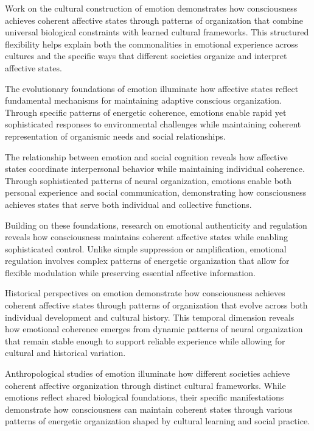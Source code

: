 Work on the cultural construction of emotion \cite{Lutz1988} demonstrates how consciousness achieves coherent affective states through patterns of organization that combine universal biological constraints with learned cultural frameworks. This structured flexibility helps explain both the commonalities in emotional experience across cultures and the specific ways that different societies organize and interpret affective states.

The evolutionary foundations of emotion \cite{Panksepp1998} illuminate how affective states reflect fundamental mechanisms for maintaining adaptive conscious organization. Through specific patterns of energetic coherence, emotions enable rapid yet sophisticated responses to environmental challenges while maintaining coherent representation of organismic needs and social relationships.

The relationship between emotion and social cognition \cite{Scherer2014} reveals how affective states coordinate interpersonal behavior while maintaining individual coherence. Through sophisticated patterns of neural organization, emotions enable both personal experience and social communication, demonstrating how consciousness achieves states that serve both individual and collective functions.

Building on these foundations, research on emotional authenticity and regulation \cite{Ekman2003} reveals how consciousness maintains coherent affective states while enabling sophisticated control. Unlike simple suppression or amplification, emotional regulation involves complex patterns of energetic organization that allow for flexible modulation while preserving essential affective information.

Historical perspectives on emotion \cite{Reddy2001} demonstrate how consciousness achieves coherent affective states through patterns of organization that evolve across both individual development and cultural history. This temporal dimension reveals how emotional coherence emerges from dynamic patterns of neural organization that remain stable enough to support reliable experience while allowing for cultural and historical variation.

Anthropological studies of emotion \cite{Rosaldo1980} illuminate how different societies achieve coherent affective organization through distinct cultural frameworks. While emotions reflect shared biological foundations, their specific manifestations demonstrate how consciousness can maintain coherent states through various patterns of energetic organization shaped by cultural learning and social practice.


